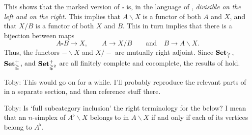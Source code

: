 \documentclass[main.tex]{subfiles}
\begin{document}
This shows that the marked version of $\square$ is, in the language of \cite{qcats_vs_segal_spaces}, \emph{divisible on the left and on the right.} This implies that $A \backslash X$ is a functor of both $A$ and $X$, and that $X / B$ is a functor of both $X$ and $B$. This in turn implies that there is a bijection between maps
\begin{equation*}
  A \square B \to X,\qquad A \to X / B \qquad \text{and}\quad B \to A \backslash X.
\end{equation*}
Thus, the functors $- \backslash X$ and $X / -$ are mutually right adjoint. Since $\mathbf{Set}_{\mathbb{\Delta}}$, $\mathbf{Set}_{\mathbb{\Delta}}^{+}$, and $\mathbf{Set}_{\mathbb{\Delta}^{2}}^{+}$ are all finitely complete and cocomplete, the results of \cite[Sec.\ 7]{qcats_vs_segal_spaces} hold.

\begin{note}
  Toby: This would go on for a while. I'll probably reproduce the relevant parts of \cite{qcats_vs_segal_spaces} in a separate section, and then reference stuff there.
\end{note}

%

\begin{note}
  Toby: Is `full subcategory inclusion' the right terminology for the below? I mean that an $n$-simplex of $A^{\flat} \backslash X$ belongs to in $A \backslash X$ if and only if each of its vertices belong to $A^{\flat}$.
\end{note}
\end{document}

